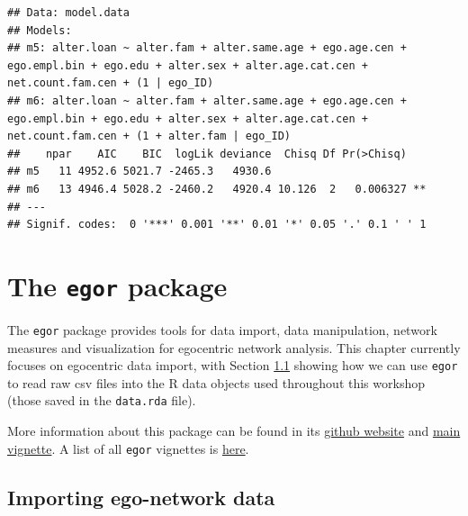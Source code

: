 \documentclass[
]{book}
\begin{document}
\begin{verbatim}
## Data: model.data
## Models:
## m5: alter.loan ~ alter.fam + alter.same.age + ego.age.cen + ego.empl.bin + ego.edu + alter.sex + alter.age.cat.cen + net.count.fam.cen + (1 | ego_ID)
## m6: alter.loan ~ alter.fam + alter.same.age + ego.age.cen + ego.empl.bin + ego.edu + alter.sex + alter.age.cat.cen + net.count.fam.cen + (1 + alter.fam | ego_ID)
##    npar    AIC    BIC  logLik deviance  Chisq Df Pr(>Chisq)   
## m5   11 4952.6 5021.7 -2465.3   4930.6                        
## m6   13 4946.4 5028.2 -2460.2   4920.4 10.126  2   0.006327 **
## ---
## Signif. codes:  0 '***' 0.001 '**' 0.01 '*' 0.05 '.' 0.1 ' ' 1
\end{verbatim}

\hypertarget{egor}{%
\chapter{\texorpdfstring{The \texttt{egor} package}{The egor package}}\label{egor}}

The \texttt{egor} package provides tools for data import, data manipulation, network measures and visualization for egocentric network analysis. This chapter currently focuses on egocentric data import, with Section \ref{egor-import} showing how we can use \texttt{egor} to read raw csv files into the R data objects used throughout this workshop (those saved in the \texttt{data.rda} file).

More information about this package can be found in its \href{https://github.com/tilltnet/egor}{github website} and \href{https://cran.r-project.org/web/packages/egor/vignettes/using_egor.html}{main vignette}. A list of all \texttt{egor} vignettes is \href{https://cran.r-project.org/web/packages/egor/index.html}{here}.

\hypertarget{egor-import}{%
\section{Importing ego-network data}\label{egor-import}}
\end{document}
